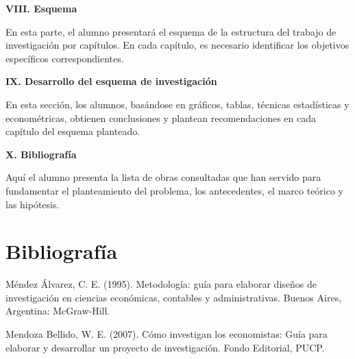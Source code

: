 \documentclass[
  a4paper,
]{article}
\begin{document}
\textbf{VIII. Esquema}

En esta parte, el alumno presentará el esquema de la estructura del
trabajo de investigación por capítulos. En cada capítulo, es necesario
identificar los objetivos específicos correspondientes.

\textbf{IX. Desarrollo del esquema de investigación}

En esta sección, los alumnos, basándose en gráficos, tablas, técnicas
estadísticas y econométricas, obtienen conclusiones y plantean
recomendaciones en cada capítulo del esquema planteado.

\textbf{X. Bibliografía}

Aquí el alumno presenta la lista de obras consultadas que han servido
para fundamentar el planteamiento del problema, los antecedentes, el
marco teórico y las hipótesis.

\hypertarget{bibliografuxeda}{%
\section{Bibliografía}\label{bibliografuxeda}}

Méndez Álvarez, C. E. (1995). Metodología: guía para elaborar diseños de
investigación en ciencias económicas, contables y administrativas.
Buenos Aires, Argentina: McGraw-Hill.

Mendoza Bellido, W. E. (2007). Cómo investigan los economistas: Guía
para elaborar y desarrollar un proyecto de investigación. Fondo
Editorial, PUCP.


\printbibliography
\end{document}
